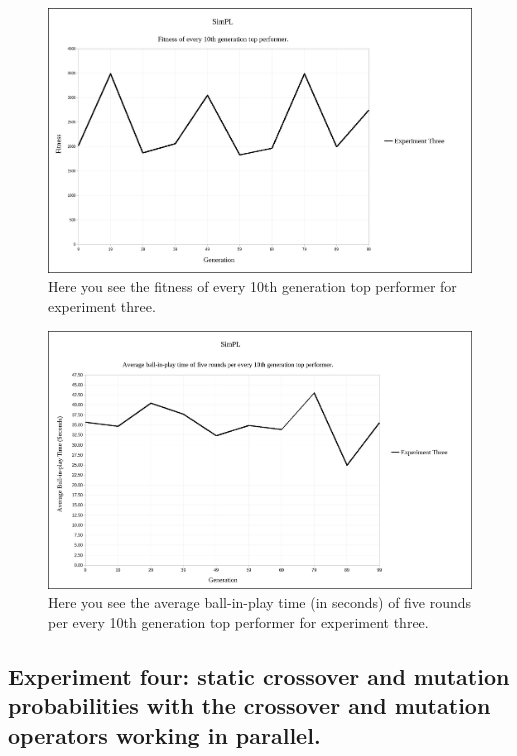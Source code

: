 \documentclass[a4paper,10pt]{article}
\begin{document}
\begin{figure}[H]  
  \centering
  \includegraphics[width=1\textwidth]{figures/exp3_10_tops.png}
  \caption{Here you see the fitness of every 10th generation top performer for experiment three.}
  \label{fig:exp3_10_tops}
\end{figure}

\begin{figure}[H]  
  \centering
  \includegraphics[width=1\textwidth]{figures/exp3_10_tops_times.png}
  \caption{Here you see the average ball-in-play time (in seconds) of five rounds per every 10th generation top performer for experiment three.}
  \label{fig:exp3_10_tops_times}
\end{figure}

\subsection{Experiment four: static crossover and mutation probabilities with the crossover and mutation operators working in parallel.}
\end{document}
